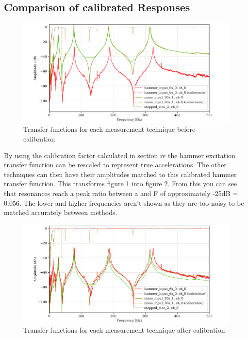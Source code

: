 \documentclass[twoside,onecolumn]{article}
\begin{document}
\subsection{Comparison of calibrated Responses}
\begin{figure}[!htb]
  \centering
    \includegraphics[width=\linewidth]{5-updatedcalibrationbefore}
  \caption{Transfer functions for each measurement technique before calibration }
  \label{fig:3b}
\end{figure}
By using the calibration factor calculated in section iv the hammer excitation transfer function can be rescaled to represent true accelerations. The other techniques can then have their amplitudes matched to this calibrated hammer transfer function. This transforms figure \ref{fig:3b} into figure \ref{fig:3a}. From this you can see that resonances reach a peak ratio between a and F of approximately -25dB = 0.056. The lower and higher frequencies aren't shown as they are too noisy to be matched accurately between methods.
\begin{figure}[!htb]
  \centering
    \includegraphics[width=\linewidth]{5-updatedcalibrationafter}
  \caption{Transfer functions for each measurement technique after calibration }
  \label{fig:3a}
\end{figure}
\end{document}
